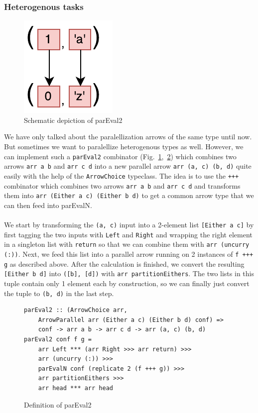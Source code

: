 \documentclass{jfp1}
\newcommand{\inlinecode}[1]{\texttt{#1}}
\begin{document}
\subsubsection{Heterogenous tasks}
\begin{figure}[h]
	\includegraphics[scale=0.7]{images/parEval2}
	\caption{Schematic depiction of parEval2}
	\label{fig:parEval2Img}
\end{figure}
We have only talked about the paralellization arrows of the same type until now. But sometimes we want to paralellize heterogenous types as well. However, we can implement such a \inlinecode{parEval2} combinator (Fig.~\ref{fig:parEval2Img},~\ref{fig:parEval2}) which combines two arrows \inlinecode{arr a b} and \inlinecode{arr c d} into a new parallel arrow \inlinecode{arr (a, c) (b, d)} quite easily with the help of the \inlinecode{ArrowChoice} typeclass. The idea is to use the \inlinecode{+++} combinator which combines two arrows \inlinecode{arr a b} and \inlinecode{arr c d} and transforms them into \inlinecode{arr (Either a c) (Either b d)} to get a common arrow type that we can then feed into parEvalN.
\\\\
We start by transforming the \inlinecode{(a, c)} input into a 2-element list \inlinecode{[Either a c]} by first tagging the two inputs with \inlinecode{Left} and \inlinecode{Right} and wrapping the right element in a singleton list with \inlinecode{return} so that we can combine them with \inlinecode{arr (uncurry (:))}. Next, we feed this list into a parallel arrow running on 2 instances of \inlinecode{f +++ g} as described above. After the calculation is finished, we convert the resulting \inlinecode{[Either b d]} into \inlinecode{([b], [d])} with \inlinecode{arr partitionEithers}. The two lists in this tuple contain only 1 element each by construction, so we can finally just convert the tuple to \inlinecode{(b, d)} in the last step.
\begin{figure}[h]
\begin{lstlisting}[frame=htrbl]
parEval2 :: (ArrowChoice arr,
	ArrowParallel arr (Either a c) (Either b d) conf) =>
	conf -> arr a b -> arr c d -> arr (a, c) (b, d)
parEval2 conf f g =
	arr Left *** (arr Right >>> arr return) >>>
	arr (uncurry (:)) >>>
	parEvalN conf (replicate 2 (f +++ g)) >>>
	arr partitionEithers >>>
	arr head *** arr head
\end{lstlisting}
	\caption{Definition of parEval2}
	\label{fig:parEval2}
\end{figure}
\end{document}
